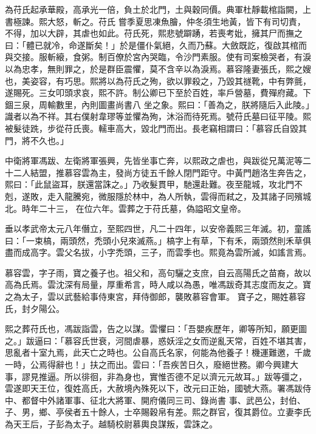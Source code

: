 \begin{pinyinscope}
 為苻氏起承華殿，高承光一倍，負土於北門，土與穀同價。典軍杜靜載棺詣闕，上書極諫。熙大怒，斬之。苻氏
 嘗季夏思凍魚膾，仲冬須生地黃，皆下有司切責，不得，加以大辟，其虐也如此。苻氏死，熙悲號躃踴，若喪考妣，擁其尸而撫之曰：「體已就冷，命遂斷矣！」於是僵仆氣絕，久而乃蘇。大斂既訖，復啟其棺而與交接。服斬縗，食粥。制百僚於宮內哭臨，令沙門素服。使有司案檢哭者，有淚以為忠孝，無則罪之，於是群臣震懼，莫不含辛以為淚焉。慕容隆妻張氏，熙之嫂也，美姿容，有巧思。熙將以為苻氏之殉，欲以罪殺之，乃毀其禭靴，中有弊氈，遂賜死。三女叩頭求哀，熙不許。制公卿已下至於百姓，率戶營墓，費殫府藏。下錮三泉，周輸數里，內則圖畫尚書八
 坐之象。熙曰：「善為之，朕將隨后入此陵。」識者以為不祥。其右僕射韋璆等並懼為殉，沐浴而待死焉。號苻氏墓曰征平陵。熙被髮徒跣，步從苻氏喪。轜車高大，毀北門而出。長老竊相謂曰：「慕容氏自毀其門，將不久也。」



 中衛將軍馮跋、左衛將軍張興，先皆坐事亡奔，以熙政之虐也，與跋從兄萬泥等二十二人結盟，推慕容雲為主，發尚方徒五千餘人閉門距守。中黃門趙洛生奔告之，熙曰：「此鼠盜耳，朕還當誅之。」乃收髮貫甲，馳還赴難。夜至龍城，攻北門不剋，遂敗，走入龍騰宛，微服隱於林中，為人所執，雲得而弒之，及其諸子同殯城北。時年二十三，
 在位六年。雲葬之于苻氏墓，偽謚昭文皇帝。



 垂以孝武帝太元八年僭立，至熙四世，凡二十四年，以安帝義熙三年滅。初，童謠曰：「一束槁，兩頭然，禿頭小兒來滅燕。」槁字上有草，下有禾，兩頭然則禾草俱盡而成高字。雲父名拔，小字禿頭，三子，而雲季也。熙竟為雲所滅，如謠言焉。



 慕容雲，字子雨，寶之養子也。祖父和，高句驪之支庶，自云高陽氏之苗裔，故以高為氏焉。雲沈深有局量，厚重希言，時人咸以為愚，唯馮跋奇其志度而友之。寶之為太子，雲以武藝給事侍東宮，拜侍御郎，襲敗慕容會軍。
 寶子之，賜姓慕容氏，封夕陽公。



 熙之葬苻氏也，馮跋詣雲，告之以謀。雲懼曰：「吾嬰疾歷年，卿等所知，願更圖之。」跋逼曰：「慕容氏世衰，河間虐暴，惑妖淫之女而逆亂天常，百姓不堪其害，思亂者十室九焉，此天亡之時也。公自高氏名家，何能為他養子！機運難邀，千歲一時，公焉得辭也！」扶之而出。雲曰：「吾疾苦日久，廢絕世務。卿今興建大事，謬見推逼。所以徘徊，非為身也，實惟否德不足以濟元元故耳。」跋等彊之，雲遂即天王位，復姓高氏，大赦境內殊死以下，改元曰正始，國號大燕。署馮跋侍中、都督中外諸軍事、征北大將軍、開府儀同三司、錄尚書
 事、武邑公，封伯、子、男，鄉、亭侯者五十餘人，士卒賜穀帛有差。熙之群官，復其爵位。立妻李氏為天王后，子彭為太子。越騎校尉慕輿良謀叛，雲誅之。




\end{pinyinscope}
